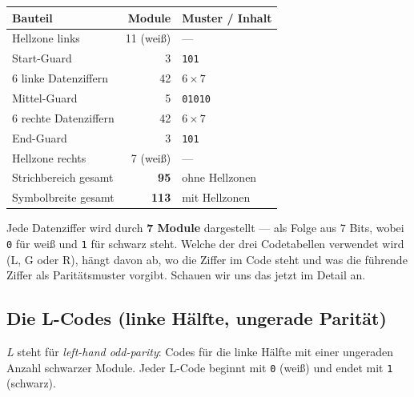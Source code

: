 \begin{center}
\begin{tabular}{l r l}
\toprule
\textbf{Bauteil}        & \textbf{Module} & \textbf{Muster / Inhalt} \\
\midrule
Hellzone links          & 11 (weiß)       & --- \\
Start-Guard             &  3              & \texttt{101} \\
6 linke Datenziffern    & 42              & $6 \times 7$ \\
Mittel-Guard            &  5              & \texttt{01010} \\
6 rechte Datenziffern   & 42              & $6 \times 7$ \\
End-Guard               &  3              & \texttt{101} \\
Hellzone rechts         &  7 (weiß)       & --- \\
\midrule
Strichbereich gesamt    & \textbf{95}     & ohne Hellzonen \\
Symbolbreite gesamt     & \textbf{113}    & mit Hellzonen \\
\bottomrule
\end{tabular}
\end{center}

Jede Datenziffer wird durch \textbf{7 Module} dargestellt — als Folge
aus 7 Bits, wobei \texttt{0} für weiß und \texttt{1} für schwarz
steht. Welche der drei Codetabellen verwendet wird (L, G oder R),
hängt davon ab, wo die Ziffer im Code steht und was die führende
Ziffer als Paritätsmuster vorgibt. Schauen wir uns das jetzt im
Detail an.

\subsection*{Die L-Codes (linke Hälfte, ungerade Parität)}

\emph{L} steht für \emph{left-hand odd-parity}: Codes für die linke
Hälfte mit einer ungeraden Anzahl schwarzer Module. Jeder L-Code
beginnt mit \texttt{0} (weiß) und endet mit \texttt{1} (schwarz).

